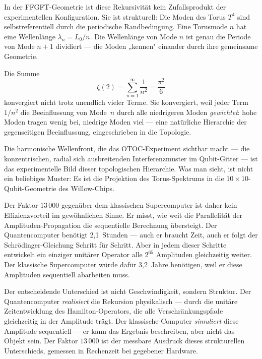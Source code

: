 In der FFGFT-Geometrie ist diese Rekursivität kein Zufallsprodukt der
experimentellen Konfiguration. Sie ist strukturell: Die Moden des Torus
$T^4$ sind selbstreferentiell durch die periodische Randbedingung.
Eine Torusmode $n$ hat eine Wellenlänge $\lambda_n = L_0/n$. Die Wellenlänge
von Mode $n$ ist genau die Periode von Mode $n+1$ dividiert — die Moden
„kennen" einander durch ihre gemeinsame Geometrie.

Die Summe
\begin{equation}
    \zeta(2) = \sum_{n=1}^{\infty} \frac{1}{n^2} = \frac{\pi^2}{6}
\end{equation}
konvergiert nicht trotz unendlich vieler Terme. Sie konvergiert, weil jeder
Term $1/n^2$ die Beeinflussung von Mode~$n$ durch alle niedrigeren Moden
\emph{gewichtet}: hohe Moden tragen wenig bei, niedrige Moden viel —
eine natürliche Hierarchie der gegenseitigen Beeinflussung, eingeschrieben
in die Topologie.

Die harmonische Wellenfront, die das OTOC-Experiment sichtbar macht — die
konzentrischen, radial sich ausbreitenden Interferenzmuster im Qubit-Gitter
— ist das experimentelle Bild dieser topologischen Hierarchie. Was man sieht,
ist nicht ein beliebiges Muster: Es ist die Projektion des Torus-Spektrums
in die $10 \times 10$-Qubit-Geometrie des Willow-Chips.

Der Faktor $13\,000$ gegenüber dem klassischen Supercomputer ist daher kein
Effizienzvorteil im gewöhnlichen Sinne. Er misst, wie weit die Parallelität
der Amplituden-Propagation die sequentielle Berechnung übersteigt. Der
Quantencomputer benötigt 2,1~Stunden — auch er braucht Zeit, auch er folgt
der Schrödinger-Gleichung Schritt für Schritt. Aber in jedem dieser Schritte
entwickelt ein einziger unitärer Operator alle $2^{65}$ Amplituden gleichzeitig
weiter. Der klassische Supercomputer würde dafür 3,2~Jahre benötigen, weil er
diese Amplituden sequentiell abarbeiten muss.

\begin{foundation}
Der entscheidende Unterschied ist nicht Geschwindigkeit, sondern Struktur.
Der Quantencomputer \emph{realisiert} die Rekursion physikalisch — durch die
unitäre Zeitentwicklung des Hamilton-Operators, die alle Verschränkungspfade
gleichzeitig in der Amplitude trägt.
Der klassische Computer \emph{simuliert} diese Amplitude sequentiell —
er kann das Ergebnis beschreiben, aber nicht das Objekt sein.
Der Faktor $13\,000$ ist der messbare Ausdruck dieses strukturellen Unterschieds,
gemessen in Rechenzeit bei gegebener Hardware.
\end{foundation}



